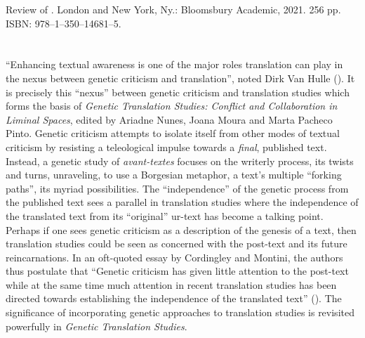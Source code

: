 


\begin{review}
\renewcommand*{\pagemark}{}


\begin{reviewed}
Review of \thecontribution. London and New York, Ny.: Bloomsbury Academic, 2021. 256 pp. ISBN: 978–1–350–14681–5.
\end{reviewed}


\section*{} 
``Enhancing textual awareness is one of the major roles translation can
play in the nexus between genetic criticism and translation'', noted
Dirk Van Hulle (\citeyear[43]{van_hulle_translation_2015}). It is precisely this ``nexus'' between
genetic criticism and translation studies which forms the basis of
\emph{Genetic Translation Studies: Conflict and Collaboration in Liminal
Spaces}, edited by Ariadne Nunes, Joana Moura and Marta Pacheco Pinto.
Genetic criticism attempts to isolate itself from other modes of textual
criticism by resisting a teleological impulse towards a \emph{final},
published text. Instead, a genetic study of \emph{avant-textes} focuses
on the writerly process, its twists and turns, unraveling, to use a
Borgesian metaphor, a text's multiple ``forking paths'', its myriad
possibilities. The ``independence'' of the genetic process from the
published text sees a parallel in translation studies where the
independence of the translated text from its ``original'' ur-text has
become a talking point. Perhaps if one sees genetic criticism as a
description of the genesis of a text, then translation studies could be
seen as concerned with the post-text and its future reincarnations. In
an oft-quoted essay by Cordingley and Montini, the authors thus
postulate that ``Genetic criticism has given little attention to the
post-text while at the same time much attention in recent translation
studies has been directed towards establishing the independence of the
translated text'' (\citeyear[5]{cordingley_genetic_2015}). The significance of incorporating genetic
approaches to translation studies is revisited powerfully in
\emph{Genetic Translation Studies}.


\end{review}
